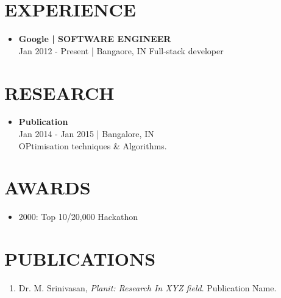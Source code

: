 \documentclass[10pt,letterpaper]{article}
\begin{document}
\begin{multicols*}{2}
\section*{EXPERIENCE}
\begin{itemize}[leftmargin=*, nosep, itemsep=0pt, parsep=0pt, topsep=0pt, partopsep=0pt]
    \item \textbf{Google | SOFTWARE ENGINEER} \\
    \footnotesize Jan 2012 - Present | Bangaore, IN
    \footnotesize Full-stack developer
\end{itemize}

\section*{RESEARCH}
\begin{itemize}[leftmargin=*, nosep, itemsep=0pt, parsep=0pt, topsep=0pt, partopsep=0pt]
    \item \textbf{Publication} \\
    \footnotesize Jan 2014 - Jan 2015 | Bangalore, IN \\
    \footnotesize OPtimisation techniques \& Algorithms.
\end{itemize}

\section*{AWARDS}
\begin{itemize}[leftmargin=*, nosep, itemsep=0pt, parsep=0pt, topsep=0pt, partopsep=0pt]
    \item 2000: Top 10/20,000 \quad Hackathon
\end{itemize}

\section*{PUBLICATIONS}
\begin{enumerate}[leftmargin=*, nosep, itemsep=0pt, parsep=0pt, topsep=0pt, partopsep=0pt]
    \item Dr. M. Srinivasan, \textit{Planit: Research In XYZ field}. Publication Name.
\end{enumerate}

\end{multicols*} %
\end{document}
